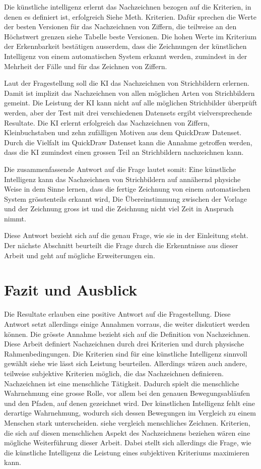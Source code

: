 Die künstliche intelligenz erlernt das Nachzeichnen bezogen auf die Kriterien,
in denen es definiert ist, erfolgreich {Siehe Meth. Kriterien}. Dafür sprechen
die Werte der besten Versionen für das Nachzeichnen von Ziffern, die teilweise
an den Höchstwert grenzen {siehe Tabelle beste Versionen}. Die hohen Werte im
Kriterium der Erkennbarkeit bestätigen ausserdem, dass die Zeichnungen der
künstlichen Intelligenz von einem automatischen System erkannt werden, zumindest
in der Mehrheit der Fälle und für das Zeichnen von Ziffern.


Laut der Fragestellung soll die KI das Nachzeichnen von Strichbildern erlernen.
Damit ist implizit das Nachzeichnen von allen möglichen Arten von Strichbildern
gemeint. Die Leistung der KI kann nicht auf alle möglichen Strichbilder
überprüft werden, aber der Test mit drei verschiedenen Datensets ergibt
vielversprechende Resultate. Die KI erlernt erfolgreich das Nachzeichnen von
Ziffern, Kleinbuchstaben und zehn zufälligen Motiven aus dem QuickDraw Datenset.
Durch die Vielfalt im QuickDraw Datenset kann die Annahme getroffen werden, dass
die KI zumindest einen grossen Teil an Strichbildern nachzeichnen kann. 

Die zusammenfassende Antwort auf die Frage lautet somit: Eine künstliche
Intelligenz kann das Nachzeichnen von Strichbildern auf annähernd physiche Weise
in dem Sinne lernen, dass die fertige Zeichnung von einem automatischen System
grösstenteils erkannt wird, Die Übereinstimmung zwischen der Vorlage und der
Zeichnung gross ist und die Zeichnung nicht viel Zeit in Anspruch nimmt.

Diese Antwort bezieht sich auf die genau Frage, wie sie in der Einleitung steht.
Der nächste Abschnitt beurteilt die Frage durch die Erkenntnisse aus dieser
Arbeit und geht auf mögliche Erweiterungen ein.



\section{Fazit und Ausblick}
\label{chap:d_faz-aus}
Die Resultate erlauben eine positive Antwort auf die Fragestellung. Diese
Antwort setzt allerdings einige Annahmen vorraus, die weiter diskutiert werden
können. Die grösste Annahme bezieht sich auf die Definition von Nachzeichnen.
Diese Arbeit definiert Nachzeichnen durch drei Kriterien und durch physische
Rahmenbedingungen. Die Kriterien sind für eine künstliche Intelligenz sinnvoll
gewählt {siehe wie lässt sich Leistung beurteilen}. Allerdings wären auch
andere, teilweise subjektive Kriterien möglich, die das Nachzeichnen definieren.
Nachzeichnen ist eine menschliche Tätigkeit. Dadurch spielt die menschliche
Wahrnehmung eine grosse Rolle, vor allem bei den genauen Bewegungsabläufen und
den Pfaden, auf denen gezeichnet wird. Der künstlichen Intelligenz fehlt eine
derartige Wahrnehmung, wodurch sich dessen Bewegungen im Vergleich zu einem
Menschen stark unterscheiden. {siehe vergleich menschliches Zeichnen}.
Kriterien, die sich auf diesen menschlichen Aspekt des Nachzeichnens beziehen
wären eine mögliche Weiterführung dieser Arbeit. Dabei stellt sich allerdings
die Frage, wie die künstliche Intelligenz die Leistung eines subjektiven
Kriteriums maximieren kann.

